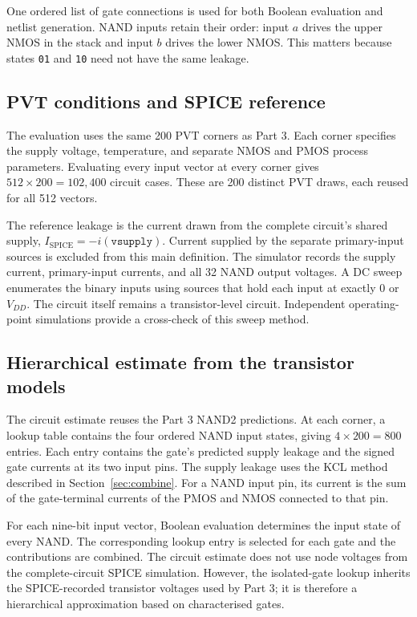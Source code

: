 \documentclass{article}
\begin{document}
One ordered list of gate connections is used for both Boolean evaluation
and netlist generation. NAND inputs retain their order: input $a$ drives
the upper NMOS in the stack and input $b$ drives the lower NMOS. This matters
because states \texttt{01} and \texttt{10} need not have the same leakage.

\subsection{PVT conditions and SPICE reference}
The evaluation uses the same 200 PVT corners as Part 3. Each corner specifies
the supply voltage, temperature, and separate NMOS and PMOS process
parameters. Evaluating every input vector at every corner gives
$512\times200=102{,}400$ circuit cases. These are 200 distinct PVT draws,
each reused for all 512 vectors.

The reference leakage is the current drawn from the complete circuit's
shared supply, $I_{\mathrm{SPICE}}=-i(\texttt{vsupply})$. Current supplied by
the separate primary-input sources is excluded from this main definition.
The simulator records the supply current, primary-input currents, and all
32 NAND output voltages. A DC sweep enumerates the binary inputs using
sources that hold each input at exactly 0 or $V_{DD}$. The circuit itself
remains a transistor-level circuit. Independent operating-point simulations
provide a cross-check of this sweep method.

\subsection{Hierarchical estimate from the transistor models}
The circuit estimate reuses the Part 3 NAND2 predictions. At each corner,
a lookup table contains the four ordered NAND input states, giving
$4\times200=800$ entries. Each entry contains the gate's predicted supply
leakage and the signed gate currents at its two input pins. The supply
leakage uses the KCL method described in Section~\ref{sec:combine}.
For a NAND input pin, its current is the sum of the gate-terminal currents
of the PMOS and NMOS connected to that pin.

For each nine-bit input vector, Boolean evaluation determines the input
state of every NAND. The corresponding lookup entry is selected for each
gate and the contributions are combined. The circuit estimate does not
use node voltages from the complete-circuit SPICE simulation. However,
the isolated-gate lookup inherits the SPICE-recorded transistor voltages
used by Part 3; it is therefore a hierarchical approximation based on
characterised gates.
\end{document}

